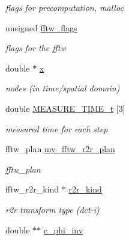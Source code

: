 \begin{CompactItemize}
\begin{CompactList}\small\item\em flags for precomputation, malloc \item\end{CompactList}\item 
\hypertarget{structnfct__plan_o12}{
unsigned \hyperlink{structnfct__plan_o12}{fftw\_\-flags}}
\label{structnfct__plan_o12}

\begin{CompactList}\small\item\em flags for the fftw \item\end{CompactList}\item 
\hypertarget{structnfct__plan_o13}{
double $\ast$ \hyperlink{structnfct__plan_o13}{x}}
\label{structnfct__plan_o13}

\begin{CompactList}\small\item\em nodes (in time/spatial domain) \item\end{CompactList}\item 
\hypertarget{structnfct__plan_o14}{
double \hyperlink{structnfct__plan_o14}{MEASURE\_\-TIME\_\-t} \mbox{[}3\mbox{]}}
\label{structnfct__plan_o14}

\begin{CompactList}\small\item\em measured time for each step \item\end{CompactList}\item 
\hypertarget{structnfct__plan_o15}{
fftw\_\-plan \hyperlink{structnfct__plan_o15}{my\_\-fftw\_\-r2r\_\-plan}}
\label{structnfct__plan_o15}

\begin{CompactList}\small\item\em fftw\_\-plan \item\end{CompactList}\item 
\hypertarget{structnfct__plan_o16}{
fftw\_\-r2r\_\-kind $\ast$ \hyperlink{structnfct__plan_o16}{r2r\_\-kind}}
\label{structnfct__plan_o16}

\begin{CompactList}\small\item\em r2r transform type (dct-i) \item\end{CompactList}\item 
\hypertarget{structnfct__plan_o17}{
double $\ast$$\ast$ \hyperlink{structnfct__plan_o17}{c\_\-phi\_\-inv}}
\label{structnfct__plan_o17}


\end{CompactItemize}
